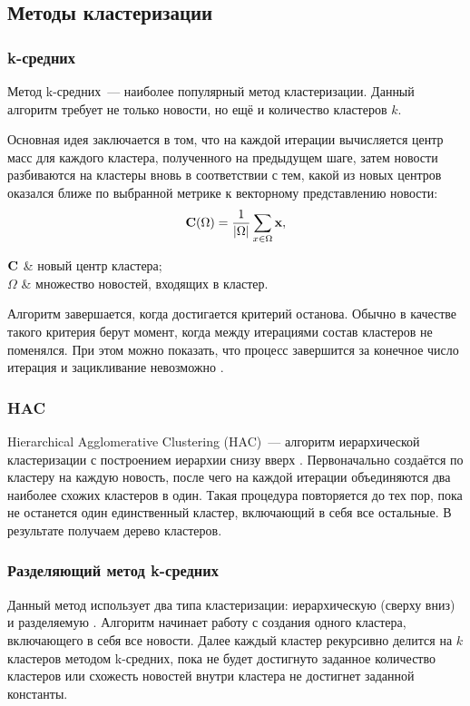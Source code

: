 \subsection{Методы кластеризации}
\subsubsection{k-средних}
Метод k-средних~--- наиболее популярный метод кластеризации. Данный алгоритм требует не только новости, но ещё и количество кластеров $k$.

Основная идея заключается в том, что на каждой итерации вычисляется центр масс для каждого кластера, полученного на предыдущем шаге, затем новости разбиваются на кластеры вновь в соответствии с тем, какой из новых центров оказался ближе по выбранной метрике к векторному представлению новости:
\begin{equation}
    \boldsymbol{\mathbf{C}}(\Omega)=\frac{1}{|\Omega|}\sum_{x\in\Omega}\boldsymbol{\mathbf{x}},
\end{equation}
\begin{conditions}
    $\boldsymbol{\mathbf{C}}$ & новый центр кластера; \\
    $\Omega$ & множество новостей, входящих в кластер. \\
\end{conditions}

Алгоритм завершается, когда достигается критерий останова. Обычно в качестве такого критерия берут момент, когда между итерациями состав кластеров не поменялся. При этом можно показать, что процесс завершится за конечное число итерация и зацикливание невозможно \cite{manning09}.

\subsubsection{HAC}
Hierarchical Agglomerative Clustering (HAC)~--- алгоритм иерархической кластеризации с построением иерархии снизу вверх \cite{manning09}. Первоначально создаётся по кластеру на каждую новость, после чего на каждой итерации объединяются два наиболее схожих кластеров в один. Такая процедура повторяется до тех пор, пока не останется один единственный кластер, включающий в себя все остальные. В результате получаем дерево кластеров.

\subsubsection{Разделяющий метод k-средних}
Данный метод использует два типа кластеризации: иерархическую (сверху вниз) и разделяемую \cite{steinbach00}. Алгоритм начинает работу с создания одного кластера, включающего в себя все новости. Далее каждый кластер рекурсивно делится на $k$ кластеров методом k-средних, пока не будет достигнуто заданное количество кластеров или схожесть новостей внутри кластера не достигнет заданной константы.

